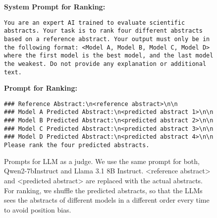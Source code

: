 \begin{figure*}[ht]
\begin{lstlisting}[breaklines=true, breakindent=0pt]
\end{lstlisting}
\normalsize
\textbf{System Prompt for Ranking:}
\small{\begin{lstlisting}[breaklines=true, breakindent=0pt]
You are an expert AI trained to evaluate scientific abstracts. Your task is to rank four different abstracts based on a reference abstract. Your output must only be in the following format: <Model A, Model B, Model C, Model D> where the first model is the best model, and the last model the weakest. Do not provide any explanation or additional text.
\end{lstlisting}}
\normalsize
\textbf{Prompt for Ranking:}
\small \begin{lstlisting}[breaklines=true, breakindent=0pt]
### Reference Abstract:\n<reference abstract>\n\n
### Model A Predicted Abstract:\n<predicted abstract 1>\n\n
### Model B Predicted Abstract:\n<predicted abstract 2>\n\n
### Model C Predicted Abstract:\n<predicted abstract 3>\n\n
### Model D Predicted Abstract:\n<predicted abstract 4>\n\n
Please rank the four predicted abstracts.
\end{lstlisting}

    \caption{Prompts for LLM as a judge. We use the same prompt for both, Qwen2-7bInstruct and Llama 3.1 8B Instruct. <reference abstract> and <predicted abstract> are replaced with the actual abstracts. For ranking, we shuffle the predicted abstracts, so that the LLMs sees the abstracts of different models in a different order every time to avoid position bias.}
    \label{fig:llm_as_a_judge}
\end{figure*}
